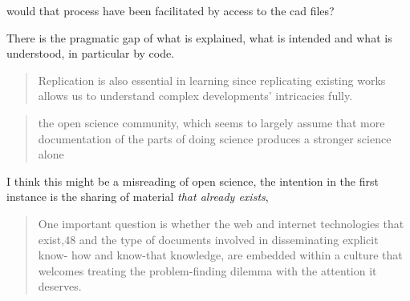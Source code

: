 would that process have been facilitated by access to the cad files?


There is the pragmatic gap of what is explained, what is intended and what is understood, in particular by code.


\cite{ajin_rebuilding_2019}



\cite{calegario_documentation_2021}


\begin{quote}
    Replication is also essential in learning since replicating existing works allows us to understand complex developments' intricacies fully.
\end{quote}


\cite{burns_documents_2021}

\begin{quote}
    the open science community, which
    seems to largely assume that more documentation of the parts of doing science produces a
    stronger science alone
\end{quote}

I think this might be a misreading of open science, the intention in the first instance is the sharing of material \textit{that already exists},

\begin{quote}
    One important question is whether the web and internet
    technologies that exist,48 and the type of documents involved in disseminating explicit know-
    how and know-that knowledge, are embedded within a culture that welcomes treating the
    problem-finding dilemma with the attention it deserves.
\end{quote}

